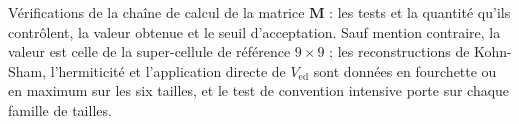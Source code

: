 \vspace*{\fill}
\clearpage
\vspace*{\fill}
\begin{table}[htbp]
    \centering
    \small
    \setlength{\tabcolsep}{2pt}
    \caption[Vérifications de la chaîne de calcul de la matrice de
    couplage.]{Vérifications de la chaîne de calcul de la matrice $\bm M$ : les tests et la quantité qu'ils contrôlent, la valeur obtenue et le seuil d'acceptation. Sauf mention contraire, la valeur est celle de la super-cellule de référence $9\times9$ ; les reconstructions de Kohn-Sham, l'hermiticité et l'application directe de $V_\text{ed}$ sont données en fourchette ou en maximum sur les six tailles, et le test de convention intensive porte sur chaque famille de tailles.}
    \label{tab:tests_M}
    
\end{table}
\vspace*{\fill}
\clearpage
